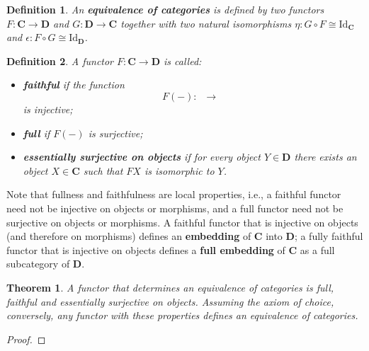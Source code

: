 \documentclass[a5paper,oneside,11pt]{article}
\newtheorem{defn}{Definition}
\newtheorem{thm}{Theorem}
\newcommand\Id{\mathord{\mathrm{Id}}}
\newcommand\1{\mathord{\mathrm{1}}}
\newcommand\cat[1]{\mathbf{#1}}
\newcommand\Hom[3]{\mathop{\mathsf{Hom}_{\cat{#1}}(#2, #3)}}
\begin{document}
\begin{defn}
    \label{defn:cateq}
    An \textbf{equivalence of categories} is defined by two functors
    $F : \cat{C} \longrightarrow \cat{D}$ and $G : \cat{D} \longrightarrow \cat{C}$
    together with two natural isomorphisms $\eta : G \circ F \cong \Id_\cat{C}$ and
    $\epsilon : F \circ G \cong \Id_\cat{D}$.
\end{defn}

\begin{defn}
    \label{defn:funcprops}
    A functor $F : \cat{C} \longrightarrow \cat{D}$ is called:
    \begin{itemize}
        \item \textbf{faithful} if the function
            $$F(-) : \Hom{C}{X}{Y} \rightarrow \Hom{D}{FX}{FY}$$ is injective;
        \item \textbf{full} if $F(-)$ is surjective;
        \item \textbf{essentially surjective on objects} if for every object
            $Y \in \cat{D}$ there exists an object $X \in \cat{C}$ such that
            $FX$ is isomorphic to $Y$.
    \end{itemize}
\end{defn}
Note that fullness and faithfulness are local properties, i.e.,
a faithful functor need not be injective on objects or morphisms,
and a full functor need not be surjective on objects or morphisms.
A faithful functor that is injective on objects (and therefore on morphisms)
defines an \textbf{embedding} of $\cat{C}$ into $\cat{D}$; a fully faithful functor
that is injective on objects defines a \textbf{full embedding} of $\cat{C}$ as a
full subcategory of $\cat{D}$.

\begin{thm}
    \label{thm:cateq}
    A functor that determines an equivalence of categories is full, faithful and
    essentially surjective on objects.
    Assuming the axiom of choice, conversely, any functor with these properties
    defines an equivalence of categories.
\end{thm}
\begin{proof}
\end{proof}
\end{document}

